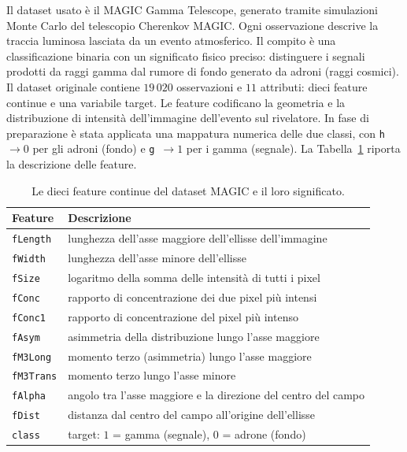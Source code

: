 \documentclass[12pt,a4paper]{article}
\begin{document}
Il dataset usato è il MAGIC Gamma Telescope, generato tramite simulazioni Monte
Carlo del telescopio Cherenkov MAGIC. Ogni osservazione descrive la traccia
luminosa lasciata da un evento
atmosferico. Il compito è una classificazione binaria
con un significato fisico preciso: distinguere i segnali prodotti da raggi gamma
dal rumore di fondo generato da adroni (raggi cosmici).
Il dataset originale contiene $19\,020$ osservazioni e $11$ attributi: dieci
feature continue e una variabile target. Le feature codificano la geometria e la
distribuzione di intensità dell'immagine dell'evento sul rivelatore. In fase di
preparazione è stata applicata una mappatura numerica delle due classi, con
\texttt{h}~$\rightarrow 0$ per gli adroni (fondo) e \texttt{g}~$\rightarrow 1$
per i gamma (segnale). La Tabella~\ref{tab:feature} riporta la descrizione delle
feature.

\begin{table}[H]\centering\small
	\caption{Le dieci feature continue del dataset MAGIC e il loro
	significato.}\label{tab:feature}
	\begin{tabular}{ll}
		\toprule
		\textbf{Feature} & \textbf{Descrizione} \\
		\midrule
		\texttt{fLength} & lunghezza dell'asse maggiore dell'ellisse dell'immagine \\
		\texttt{fWidth} & lunghezza dell'asse minore dell'ellisse \\
		\texttt{fSize} & logaritmo della somma delle intensità di tutti i pixel \\
		\texttt{fConc} & rapporto di concentrazione dei due pixel più intensi \\
		\texttt{fConc1} & rapporto di concentrazione del pixel più intenso \\
		\texttt{fAsym} & asimmetria della distribuzione lungo l'asse maggiore \\
		\texttt{fM3Long} & momento terzo (asimmetria) lungo l'asse maggiore \\
		\texttt{fM3Trans} & momento terzo lungo l'asse minore \\
		\texttt{fAlpha} & angolo tra l'asse maggiore e la direzione del centro del
		campo \\
		\texttt{fDist} & distanza dal centro del campo all'origine dell'ellisse \\
		\midrule
		\texttt{class} & target: $1$ = gamma (segnale), $0$ = adrone (fondo) \\
		\bottomrule
	\end{tabular}
\end{table}
\end{document}
